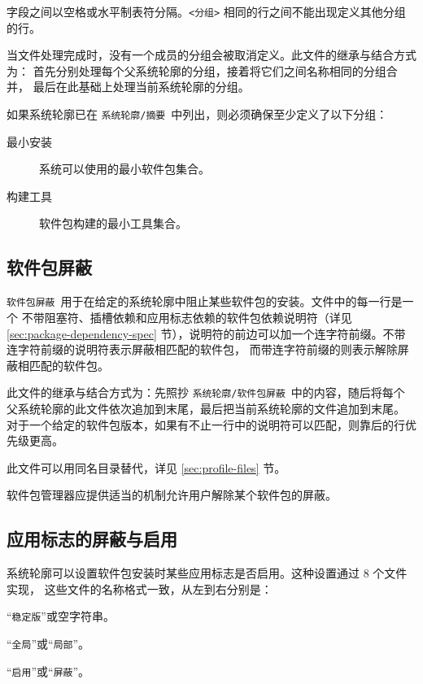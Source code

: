 字段之间以空格或水平制表符分隔。\texttt{<\hspace{0em}分组\hspace{0em}>}
相同的行之间不能出现定义其他分组的行。

当文件处理完成时，没有一个成员的分组会被取消定义。此文件的继承与结合方式为：
首先分别处理每个父系统轮廓的分组，接着将它们之间名称相同的分组合并，
最后在此基础上处理当前系统轮廓的分组。

如果系统轮廓已在 \texttt{系统轮廓/摘要}\ 中列出，则必须确保至少定义了以下分组：
\begin{description}
\item[最小安装] 系统可以使用的最小软件包集合。
\item[构建工具] 软件包构建的最小工具集合。
\end{description}

\subsection{软件包屏蔽}
\texttt{软件包屏蔽}\ 用于在给定的系统轮廓中阻止某些软件包的安装。文件中的每一行是一个
不带阻塞符、插槽依赖和应用标志依赖的软件包依赖说明符（详见 \ref{sec:package-dependency-spec}
节），说明符的前边可以加一个连字符前缀。不带连字符前缀的说明符表示屏蔽相匹配的软件包，
而带连字符前缀的则表示解除屏蔽相匹配的软件包。

此文件的继承与结合方式为：先照抄 \texttt{系统轮廓/软件包屏蔽}\ 中的内容，随后将每个
父系统轮廓的此文件依次追加到末尾，最后把当前系统轮廓的文件追加到末尾。
对于一个给定的软件包版本，如果有不止一行中的说明符可以匹配，则靠后的行优先级更高。

此文件可以用同名目录替代，详见 \ref{sec:profile-files} 节。

软件包管理器应提供适当的机制允许用户解除某个软件包的屏蔽。

\subsection{应用标志的屏蔽与启用}
\label{sec:use-masking}
系统轮廓可以设置软件包安装时某些应用标志是否启用。这种设置通过 8 个文件实现，
这些文件的名称格式一致，从左到右分别是：
\begin{compactitem}
\item “\texttt{稳定版}”或空字符串。
\item “\texttt{全局}”或“\texttt{局部}”。
\item “\texttt{启用}”或“\texttt{屏蔽}”。
\end{compactitem}

